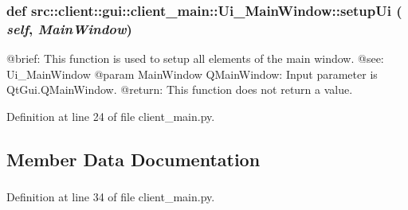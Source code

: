 \hypertarget{classsrc_1_1client_1_1gui_1_1client__main_1_1Ui__MainWindow_a18e21715fbea4f359eda51e3fb566566}{
\subsubsection[{setupUi}]{\setlength{\rightskip}{0pt plus 5cm}def src::client::gui::client\_\-main::Ui\_\-MainWindow::setupUi ( {\em self}, \/   {\em MainWindow})}}
\label{classsrc_1_1client_1_1gui_1_1client__main_1_1Ui__MainWindow_a18e21715fbea4f359eda51e3fb566566}
\begin{DoxyVerb}
@brief: This function is used to setup all elements of the main window.
@see: Ui_MainWindow
@param MainWindow QMainWindow: Input parameter is QtGui.QMainWindow.
@return: This function does not return a value. 
\end{DoxyVerb}
 

Definition at line 24 of file client\_\-main.py.



\subsection{Member Data Documentation}
\hypertarget{classsrc_1_1client_1_1gui_1_1client__main_1_1Ui__MainWindow_a293c710255ce97cbf8777f36b369a911}{
\subsubsection[{centralwidget}]{}}
\label{classsrc_1_1client_1_1gui_1_1client__main_1_1Ui__MainWindow_a293c710255ce97cbf8777f36b369a911}


Definition at line 34 of file client\_\-main.py.

\hypertarget{classsrc_1_1client_1_1gui_1_1client__main_1_1Ui__MainWindow_a7c972e3d0932c958efeeb703ec62af8c}{
\subsubsection[{draw\_\-osm\_\-from\_\-file}]{}}
\label{classsrc_1_1client_1_1gui_1_1client__main_1_1Ui__MainWindow_a7c972e3d0932c958efeeb703ec62af8c}


